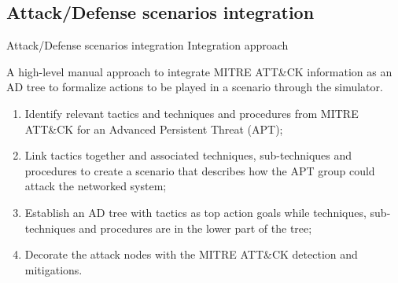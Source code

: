 	\subsection{Attack/Defense scenarios integration}
	\begin{frame}{Attack/Defense scenarios integration}
            {Integration approach}

            A high-level manual approach to integrate MITRE ATT\&CK information as an AD tree to formalize actions to be played in a scenario through the simulator.

            \begin{enumerate}
            
                \item Identify relevant tactics and techniques and procedures from MITRE ATT\&CK for an Advanced Persistent Threat (APT);
                
                \item Link tactics together and associated techniques, sub-techniques and procedures to create a scenario that describes how the APT group could attack the networked system;
            
                \item Establish an AD tree with tactics as top action goals while techniques, sub-techniques and procedures are in the lower part of the tree;
            
                \item Decorate the attack nodes with the MITRE ATT\&CK detection and mitigations.
                
            \end{enumerate}

        \end{frame}

